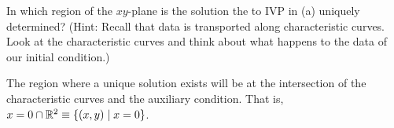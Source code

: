 In which region of the $xy$-plane is the solution the to IVP in (a) uniquely determined? (Hint: Recall that data is transported along characteristic curves. Look at the characteristic curves and think about what happens to the data of our initial condition.)

\soln* The region where a unique solution exists will be at the intersection of the characteristic curves and the auxiliary condition. That is, $x=0 \cap \mathbb{R}^2 \equiv \{(x,y) \mid x = 0\}$.